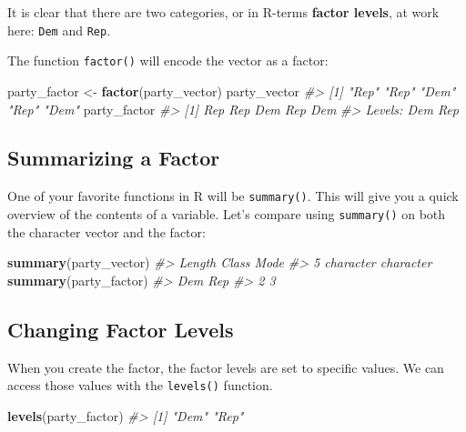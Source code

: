 \documentclass[]{book}
\newenvironment{Shaded}{\begin{snugshade}}{\end{snugshade}}
\newcommand{\KeywordTok}[1]{\textcolor[rgb]{0.13,0.29,0.53}{\textbf{#1}}}
\newcommand{\StringTok}[1]{\textcolor[rgb]{0.31,0.60,0.02}{#1}}
\newcommand{\CommentTok}[1]{\textcolor[rgb]{0.56,0.35,0.01}{\textit{#1}}}
\newcommand{\NormalTok}[1]{#1}
\begin{document}
It is clear that there are two categories, or in R-terms \textbf{factor
levels}, at work here: \texttt{Dem} and \texttt{Rep}.

The function \texttt{factor()} will encode the vector as a factor:

\begin{Shaded}
\begin{Highlighting}[]
\NormalTok{party_factor <-}\StringTok{ }\KeywordTok{factor}\NormalTok{(party_vector)}
\NormalTok{party_vector}
\CommentTok{#> [1] "Rep" "Rep" "Dem" "Rep" "Dem"}
\NormalTok{party_factor}
\CommentTok{#> [1] Rep Rep Dem Rep Dem}
\CommentTok{#> Levels: Dem Rep}
\end{Highlighting}
\end{Shaded}

\subsection{Summarizing a Factor}\label{summarizing-a-factor}

One of your favorite functions in R will be \texttt{summary()}. This
will give you a quick overview of the contents of a variable. Let's
compare using \texttt{summary()} on both the character vector and the
factor:

\begin{Shaded}
\begin{Highlighting}[]
\KeywordTok{summary}\NormalTok{(party_vector)}
\CommentTok{#>    Length     Class      Mode }
\CommentTok{#>         5 character character}
\KeywordTok{summary}\NormalTok{(party_factor)}
\CommentTok{#> Dem Rep }
\CommentTok{#>   2   3}
\end{Highlighting}
\end{Shaded}

\subsection{Changing Factor Levels}\label{changing-factor-levels}

When you create the factor, the factor levels are set to specific
values. We can access those values with the \texttt{levels()} function.

\begin{Shaded}
\begin{Highlighting}[]
\KeywordTok{levels}\NormalTok{(party_factor)}
\CommentTok{#> [1] "Dem" "Rep"}
\end{Highlighting}
\end{Shaded}
\end{document}
